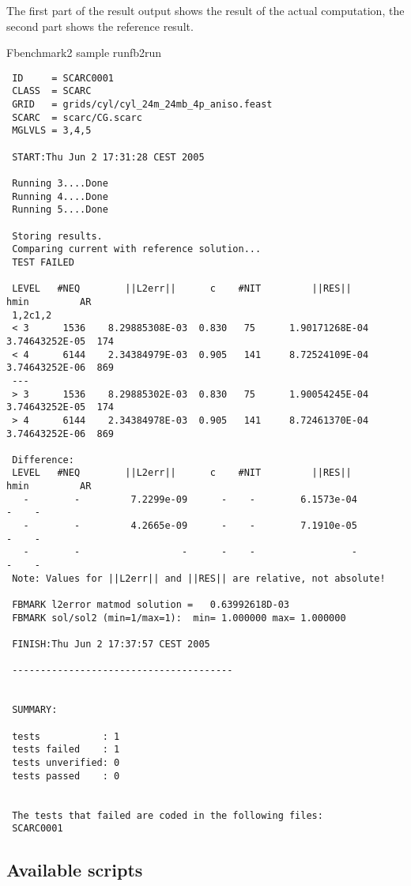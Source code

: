 The first part of the result output shows the result of the actual
computation, the second part shows the reference result.

\begin{code}{Fbenchmark2 sample run}{fb2run}
\begin{verbatim}
 ID     = SCARC0001
 CLASS  = SCARC
 GRID   = grids/cyl/cyl_24m_24mb_4p_aniso.feast
 SCARC  = scarc/CG.scarc
 MGLVLS = 3,4,5

 START:Thu Jun 2 17:31:28 CEST 2005

 Running 3....Done
 Running 4....Done
 Running 5....Done

 Storing results.
 Comparing current with reference solution...
 TEST FAILED

 LEVEL   #NEQ        ||L2err||      c    #NIT         ||RES||        hmin         AR
 1,2c1,2
 < 3      1536    8.29885308E-03  0.830   75      1.90171268E-04  3.74643252E-05  174
 < 4      6144    2.34384979E-03  0.905   141     8.72524109E-04  3.74643252E-06  869
 ---
 > 3      1536    8.29885302E-03  0.830   75      1.90054245E-04  3.74643252E-05  174
 > 4      6144    2.34384978E-03  0.905   141     8.72461370E-04  3.74643252E-06  869

 Difference:
 LEVEL   #NEQ        ||L2err||      c    #NIT         ||RES||        hmin         AR
   -        -         7.2299e-09      -    -        6.1573e-04                 -    -
   -        -         4.2665e-09      -    -        7.1910e-05                 -    -
   -        -                  -      -    -                 -                 -    -
 Note: Values for ||L2err|| and ||RES|| are relative, not absolute!

 FBMARK l2error matmod solution =   0.63992618D-03
 FBMARK sol/sol2 (min=1/max=1):  min= 1.000000 max= 1.000000

 FINISH:Thu Jun 2 17:37:57 CEST 2005

 ---------------------------------------


 SUMMARY:

 tests           : 1
 tests failed    : 1
 tests unverified: 0
 tests passed    : 0


 The tests that failed are coded in the following files:
 SCARC0001
\end{verbatim}
\end{code}


\subsection{Available scripts}
\label{sec:fbenchmark2:scripts}

